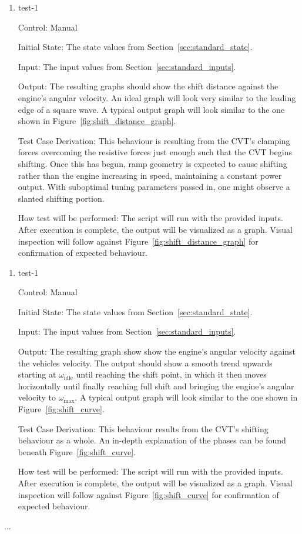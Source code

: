 \documentclass[12pt, titlepage]{article}
\begin{document}
\begin{enumerate}
  
  \item{test-1\\}
  
  Control: Manual
            
  Initial State: The state values from Section~\ref{sec:standard_state}.
  
  Input: The input values from Section~\ref{sec:standard_inputs}.
            
  Output: The resulting graphs should show the shift distance against the engine's angular velocity. An ideal graph will look very similar to the leading edge of a square wave. A typical output graph will look similar to the one shown in Figure~\ref{fig:shift_distance_graph}.
  
  Test Case Derivation: This behaviour is resulting from the CVT's clamping forces overcoming the resistive forces just enough such that the CVT begins shifting. Once this has begun, ramp geometry is expected to cause shifting rather than the engine increasing in speed, maintaining a constant power output. With suboptimal tuning parameters passed in, one might observe a slanted shifting portion.
  
  How test will be performed: The script will run with the provided inputs. After execution is complete, the output will be visualized as a graph. Visual inspection will follow against Figure~\ref{fig:shift_distance_graph} for confirmation of expected behaviour.
  
\end{enumerate}

\begin{enumerate}
  
  \item{test-1\\}
  
  Control: Manual
            
  Initial State: The state values from Section~\ref{sec:standard_state}.
  
  Input: The input values from Section~\ref{sec:standard_inputs}.
            
  Output: The resulting graph show show the engine's angular velocity against the vehicles velocity. The output should show a smooth trend upwards starting at $\omega_\text{idle}$ until reaching the shift point, in which it then moves horizontally until finally reaching full shift and bringing the engine's angular velocity to $\omega_\text{max}$. A typical output graph will look similar to the one shown in Figure~\ref{fig:shift_curve}.
  
  Test Case Derivation: This behaviour results from the CVT's shifting behaviour as a whole. An in-depth explanation of the phases can be found beneath Figure~\ref{fig:shift_curve}.
  
  How test will be performed: The script will run with the provided inputs. After execution is complete, the output will be visualized as a graph. Visual inspection will follow against Figure~\ref{fig:shift_curve} for confirmation of expected behaviour.
  
\end{enumerate}
...
\end{document}
